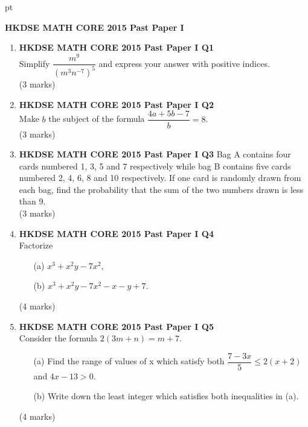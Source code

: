 \documentclass[12pt]{article}
\begin{document}
 pt
\begin{center}
	{\large \bf HKDSE MATH CORE 2015 Past Paper I}\\
	\vspace{2 mm}

\end{center}
\vspace{0.05cm}

\begin{enumerate}
	\item \textbf{HKDSE MATH CORE 2015 Past Paper I Q1}\\
	Simplify $\dfrac{m^9}{(m^3n^{-7})^5}$ and express your answer with positive indices. \\(3 marks)	
	
	\item \textbf{HKDSE MATH CORE 2015 Past Paper I Q2}\\
	Make $b$ the subject of the formula $\dfrac{4a+5b-7}{b} = 8$. \\(3 marks)

	\item \textbf{HKDSE MATH CORE 2015 Past Paper I Q3}
	Bag A contains four cards numbered 1, 3, 5 and 7 respectively while bag B contains five cards numbered 2, 4, 6, 8 and 10 respectively. If one card is randomly drawn from each bag, find the probability that the sum of the two numbers drawn is less than 9. \\(3 marks)

	\item \textbf{HKDSE MATH CORE 2015 Past Paper I Q4}\\
	Factorize
	\begin{enumerate}
		\item[(a)] $x^3 + x^2y -7x^2$,
		\item[(b)] $x^3 + x^2y -7x^2 -x -y +7$.
	\end{enumerate}
	(4 marks)

	\item \textbf{HKDSE MATH CORE 2015 Past Paper I Q5}\\
	Consider the formula $2(3m +n) = m + 7$.
	\begin{enumerate}
		\item[(a)] Find the range of values of x which satisfy both $\dfrac{7 - 3x}{5} \leq 2(x+2)$ and $4x - 13>0$.
		\item[(b)] Write down the least integer which satisfies both inequalities in (a).	
	\end{enumerate}
	(4 marks)
   

\end{enumerate}
\end{document}
